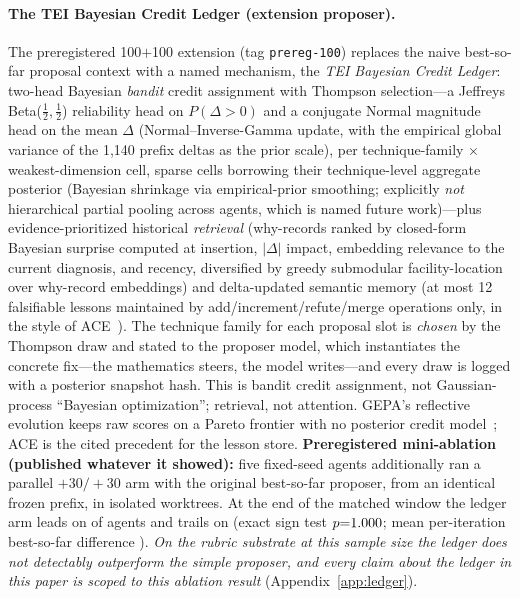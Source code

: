 \documentclass[11pt]{article}
\begin{document}
\paragraph{The TEI Bayesian Credit Ledger (extension proposer).}
The preregistered 100$+$100 extension (tag \texttt{prereg-100}) replaces the
naive best-so-far proposal context with a named mechanism, the \emph{TEI
Bayesian Credit Ledger}: two-head Bayesian \emph{bandit} credit assignment
with Thompson selection---a Jeffreys Beta($\tfrac12,\tfrac12$) reliability
head on $P(\Delta{>}0)$ and a conjugate Normal magnitude head on the mean
$\Delta$ (Normal--Inverse-Gamma update, with the empirical global variance
of the 1{,}140 prefix deltas as the prior scale), per technique-family
$\times$ weakest-dimension cell, sparse cells borrowing their
technique-level aggregate posterior (Bayesian shrinkage via empirical-prior
smoothing; explicitly \emph{not} hierarchical partial pooling across agents,
which is named future work)---plus evidence-prioritized historical
\emph{retrieval} (why-records ranked by closed-form Bayesian surprise
computed at insertion, $|\Delta|$ impact, embedding relevance to the current
diagnosis, and recency, diversified by greedy submodular facility-location
over why-record embeddings) and delta-updated semantic memory (at most 12
falsifiable lessons maintained by add/increment/refute/merge operations
only, in the style of ACE~\citep{ace2026}). The technique family for each
proposal slot is \emph{chosen} by the Thompson draw and stated to the
proposer model, which instantiates the concrete fix---the mathematics
steers, the model writes---and every draw is logged with a posterior
snapshot hash. This is bandit credit assignment, not Gaussian-process
``Bayesian optimization''; retrieval, not attention. GEPA's reflective
evolution keeps raw scores on a Pareto frontier with no posterior credit
model~\citep{gepa2025}; ACE is the cited precedent for the lesson store.
\textbf{Preregistered mini-ablation (published whatever it showed):} five
fixed-seed agents additionally ran a parallel $+30/+30$ arm with the
original best-so-far proposer, from an identical frozen prefix, in isolated
worktrees. At the end of the matched window the ledger arm leads on
\swAblWins{} of \swAblN{} agents and trails on \swAblLoss{} (exact sign test
$p{=}1.000$; mean per-iteration best-so-far difference
\swAblMeanDiff). \emph{On the rubric substrate at this sample size the
ledger does not detectably outperform the simple proposer, and every claim
about the ledger in this paper is scoped to this ablation result}
(Appendix~\ref{app:ledger}).
\end{document}
